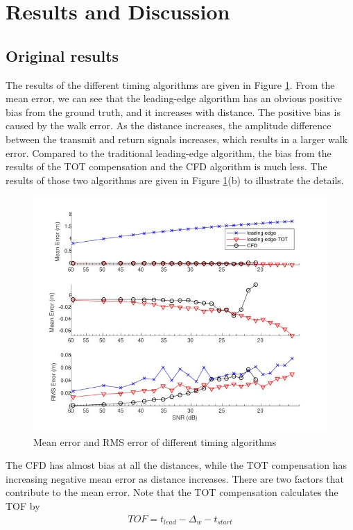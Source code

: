 \section{Results and Discussion}
\subsection{Original results}
The results of the different timing algorithms are given in Figure \ref{fig:TDC_Error_beforeFilter}. From the mean error, we can see that the leading-edge algorithm has an obvious positive bias from the ground truth, and it increases with distance. The positive bias is caused by the walk error. As the distance increases, the amplitude difference between the transmit and return signals increases, which results in a larger walk error. Compared to the traditional leading-edge algorithm, the bias from the results of the TOT compensation and the CFD algorithm is much less. The results of those two algorithms are given in Figure \ref{fig:TDC_Error_beforeFilter}(b) to illustrate the details. 
\begin{figure}[t!p]
\centering
\includegraphics[width=.8\textwidth]{figures/chapter7_TDC/fig_distError_snr.jpg}
\caption{Mean error and RMS error of different timing algorithms}
\label{fig:TDC_Error_beforeFilter}
\end{figure}
The CFD has almost bias at all the distances, while the TOT compensation has increasing negative mean error as distance increases. There are two factors that contribute to the mean error. Note that the TOT compensation calculates the TOF by
\begin{align} \label{eq:TDC_TOT}
TOF=t_{lead}-\Delta_w-t_{start}    
\end{align}

